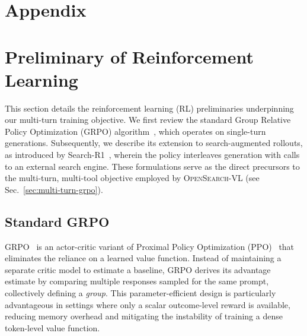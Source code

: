 \section*{Appendix}
\label{sec:appendix}


\startcontents[appendix]
\begingroup
\hypersetup{linkcolor=promptblue}
\endgroup




\section{Preliminary of Reinforcement Learning}
\label{apdx:rl}

This section details the reinforcement learning (RL) preliminaries underpinning our multi-turn training objective. We first review the standard Group Relative Policy Optimization (GRPO) algorithm~\citep{shao2024deepseekmath}, which operates on single-turn generations. Subsequently, we describe its extension to search-augmented rollouts, as introduced by Search-R1~\citep{jin2025searchr1trainingllmsreason}, wherein the policy interleaves generation with calls to an external search engine. These formulations serve as the direct precursors to the multi-turn, multi-tool objective employed by \textsc{OpenSearch-VL} (see Sec.~\ref{sec:multi-turn-grpo}).

\subsection{Standard GRPO}

GRPO~\citep{shao2024deepseekmath} is an actor-critic variant of Proximal Policy Optimization (PPO)~\citep{schulman2017proximal} that eliminates the reliance on a learned value function. Instead of maintaining a separate critic model to estimate a baseline, GRPO derives its advantage estimate by comparing multiple responses sampled for the same prompt, collectively defining a \emph{group}. This parameter-efficient design is particularly advantageous in settings where only a scalar outcome-level reward is available, reducing memory overhead and mitigating the instability of training a dense token-level value function.

